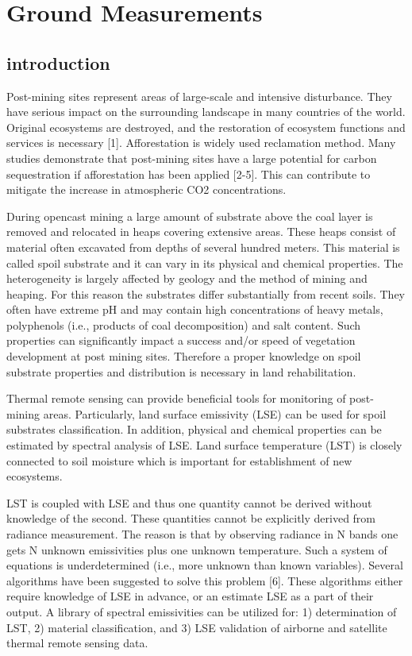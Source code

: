 \chapter{Ground Measurements}

\section{introduction}

Post-mining sites represent areas of large-scale and intensive disturbance. They have serious impact on the surrounding landscape in many countries of the world. Original ecosystems are destroyed, and the restoration of ecosystem functions and services is necessary [1]. Afforestation is widely used reclamation method. Many studies demonstrate that post-mining sites have a large potential for carbon sequestration if afforestation has been applied [2-5]. This can contribute to mitigate the increase in atmospheric CO2 concentrations.

During opencast mining a large amount of substrate above the coal layer is removed and relocated in heaps covering extensive areas. These heaps consist of material often excavated from depths of several hundred meters. This material is called spoil substrate and it can vary in its physical and chemical properties. The heterogeneity is largely affected by geology and the method of mining and heaping. For this reason the substrates differ substantially from recent soils. They often have extreme pH and may contain high concentrations of heavy metals, polyphenols (i.e., products of coal decomposition) and salt content. Such properties can significantly impact a success and/or speed of vegetation development at post mining sites. Therefore a proper knowledge on spoil substrate properties and distribution is necessary in land rehabilitation. 

Thermal remote sensing can provide beneficial tools for monitoring of post-mining areas. Particularly, land surface emissivity (LSE) can be used for spoil substrates classification. In addition, physical and chemical properties can be estimated by spectral analysis of LSE. Land surface temperature (LST) is closely connected to soil moisture which is important for establishment of new ecosystems.

LST is coupled with LSE and thus one quantity cannot be derived without knowledge of the second. These quantities cannot be explicitly derived from radiance measurement. The reason is that by observing radiance in N bands one gets N unknown emissivities plus one unknown temperature. Such a system of equations is underdetermined (i.e., more unknown than known variables). Several algorithms have been suggested to solve this problem [6]. These algorithms either require knowledge of LSE in advance, or an estimate LSE as a part of their output. A library of spectral emissivities can be utilized for: 1) determination of LST, 2) material classification, and 3) LSE validation of airborne and satellite thermal remote sensing data.

